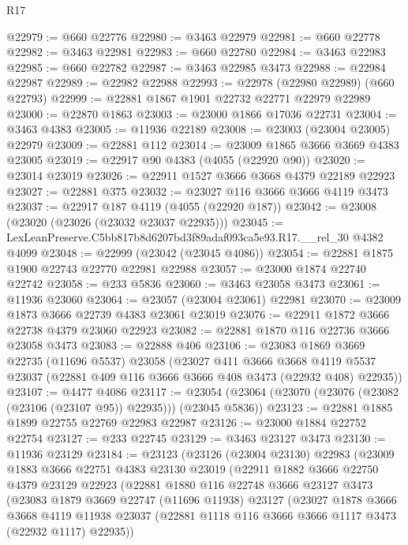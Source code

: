 \begin{lexlean}{R17}
\begin{coremodule}
@22979 := @660 @22776
@22980 := @3463 @22979
@22981 := @660 @22778
@22982 := @3463 @22981
@22983 := @660 @22780
@22984 := @3463 @22983
@22985 := @660 @22782
@22987 := @3463 @22985 @3473
@22988 := @22984 @22987
@22989 := @22982 @22988
@22993 := @22978 (@22980 @22989) (@660 @22793)
@22999 := @22881 @1867 @1901 @22732 @22771 @22979 @22989
@23000 := @22870 @1863
@23003 := @23000 @1866 @17036 @22731
@23004 := @3463 @4383
@23005 := @11936 @22189
@23008 := @23003 (@23004 @23005) @22979
@23009 := @22881 @112
@23014 := @23009 @1865 @3666 @3669 @4383 @23005
@23019 := @22917 @90 @4383 (@4055 (@22920 @90))
@23020 := @23014 @23019
@23026 := @22911 @1527 @3666 @3668 @4379 @22189 @22923
@23027 := @22881 @375
@23032 := @23027 @116 @3666 @3666 @4119 @3473
@23037 := @22917 @187 @4119 (@4055 (@22920 @187))
@23042 := @23008 (@23020 (@23026 (@23032 @23037 @22935)))
@23045 := LexLeanPreserve.C5bb817b8d6207bd3f89adaf093ca5e93.R17.__rel_30 @4382 @4099
@23048 := @22999 (@23042 (@23045 @4086))
@23054 := @22881 @1875 @1900 @22743 @22770 @22981 @22988
@23057 := @23000 @1874 @22740 @22742
@23058 := @233 @5836
@23060 := @3463 @23058 @3473
@23061 := @11936 @23060
@23064 := @23057 (@23004 @23061) @22981
@23070 := @23009 @1873 @3666 @22739 @4383 @23061 @23019
@23076 := @22911 @1872 @3666 @22738 @4379 @23060 @22923
@23082 := @22881 @1870 @116 @22736 @3666 @23058 @3473
@23083 := @22888 @406
@23106 := @23083
    @1869
    @3669
    @22735
    (@11696 @5537)
    @23058
    (@23027
      @411
      @3666
      @3668
      @4119
      @5537
      @23037
      (@22881 @409 @116 @3666 @3666 @408 @3473 (@22932 @408) @22935))
@23107 := @4477 @4086
@23117 := @23054 (@23064 (@23070 (@23076 (@23082 (@23106 (@23107 @95)) @22935))) (@23045 @5836))
@23123 := @22881 @1885 @1899 @22755 @22769 @22983 @22987
@23126 := @23000 @1884 @22752 @22754
@23127 := @233 @22745
@23129 := @3463 @23127 @3473
@23130 := @11936 @23129
@23184 := @23123
    (@23126
      (@23004 @23130)
      @22983
      (@23009
        @1883
        @3666
        @22751
        @4383
        @23130
        @23019
        (@22911
          @1882
          @3666
          @22750
          @4379
          @23129
          @22923
          (@22881
            @1880
            @116
            @22748
            @3666
            @23127
            @3473
            (@23083
              @1879
              @3669
              @22747
              (@11696 @11938)
              @23127
              (@23027
                @1878
                @3666
                @3668
                @4119
                @11938
                @23037
                (@22881 @1118 @116 @3666 @3666 @1117 @3473 (@22932 @1117) @22935))

\end{coremodule}
\end{lexlean}
